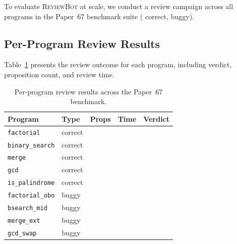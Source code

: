 \documentclass[11pt]{article}
\newcommand{\ReviewBot}{\textsc{ReviewBot}}
\begin{document}
To evaluate \ReviewBot{} at scale, we conduct a review campaign across all
\ppLXVIIprogramCount{} programs in the Paper~67 benchmark suite
(\ppLXVIIcorrectCount{} correct, \ppLXVIIbuggyCount{} buggy).

\subsection{Per-Program Review Results}

Table~\ref{tab:per-program} presents the review outcome for each program,
including verdict, proposition count, and review time.

\begin{table}[t]
\centering
\caption{Per-program review results across the Paper~67 benchmark.}
\label{tab:per-program}
\begin{tabular}{llrrr}
\toprule
\textbf{Program} & \textbf{Type} & \textbf{Props} & \textbf{Time} &
  \textbf{Verdict} \\
\midrule
\texttt{factorial} & correct &
  \ppLXVIIrevfactorialProps{} & \ppLXVIIrevfactorialTime{} &
  \ppLXVIIrevfactorialVerdict{} \\
\texttt{binary\_search} & correct &
  \ppLXVIIrevbinarysearchProps{} & \ppLXVIIrevbinarysearchTime{} &
  \ppLXVIIrevbinarysearchVerdict{} \\
\texttt{merge} & correct &
  \ppLXVIIrevmergeProps{} & \ppLXVIIrevmergeTime{} &
  \ppLXVIIrevmergeVerdict{} \\
\texttt{gcd} & correct &
  \ppLXVIIrevgcdProps{} & \ppLXVIIrevgcdTime{} &
  \ppLXVIIrevgcdVerdict{} \\
\texttt{is\_palindrome} & correct &
  \ppLXVIIrevispalindromeProps{} & \ppLXVIIrevispalindromeTime{} &
  \ppLXVIIrevispalindromeVerdict{} \\
\midrule
\texttt{factorial\_obo} & buggy &
  \ppLXVIIrevfactorialoffbyoneProps{} &
  \ppLXVIIrevfactorialoffbyoneTime{} &
  \ppLXVIIrevfactorialoffbyoneVerdict{} \\
\texttt{bsearch\_mid} & buggy &
  \ppLXVIIrevbinarysearchwrongmidProps{} &
  \ppLXVIIrevbinarysearchwrongmidTime{} &
  \ppLXVIIrevbinarysearchwrongmidVerdict{} \\
\texttt{merge\_ext} & buggy &
  \ppLXVIIrevmergemissingextendProps{} &
  \ppLXVIIrevmergemissingextendTime{} &
  \ppLXVIIrevmergemissingextendVerdict{} \\
\texttt{gcd\_swap} & buggy &
  \ppLXVIIrevgcdwrongswapProps{} &
  \ppLXVIIrevgcdwrongswapTime{} &
  \ppLXVIIrevgcdwrongswapVerdict{} \\

\end{tabular}
\end{table}
\end{document}
